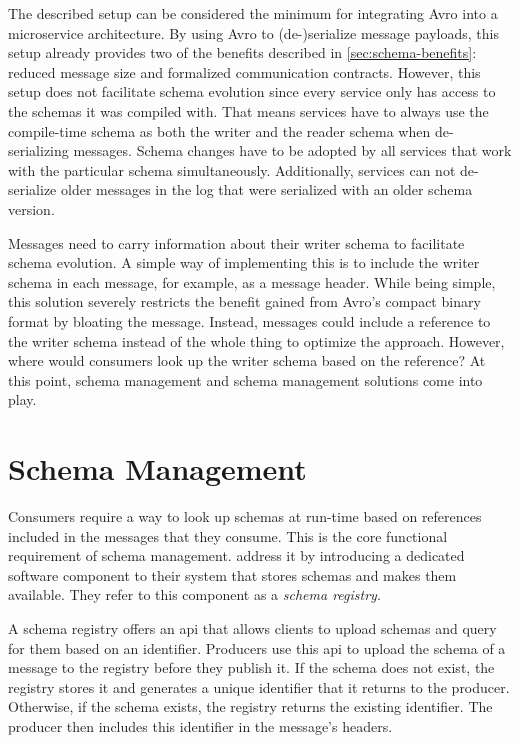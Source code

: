 The described setup can be considered the minimum for integrating Avro into a microservice architecture.
By using Avro to (de-)serialize message payloads, this setup already provides two of the benefits described in \ref{sec:schema-benefits}: reduced message size and formalized communication contracts.
However, this setup does not facilitate schema evolution since every service only has access to the schemas it was compiled with.
That means services have to always use the compile-time schema as both the writer and the reader schema when de-serializing messages.
Schema changes have to be adopted by all services that work with the particular schema simultaneously.
Additionally, services can not de-serialize older messages in the log that were serialized with an older schema version.

Messages need to carry information about their writer schema to facilitate schema evolution.
A simple way of implementing this is to include the writer schema in each message, for example, as a message header.
While being simple, this solution severely restricts the benefit gained from Avro's compact binary format by bloating the message.
Instead, messages could include a reference to the writer schema instead of the whole thing to optimize the approach.
However, where would consumers look up the writer schema based on the reference?
At this point, schema management and schema management solutions come into play.

\section{Schema Management}

Consumers require a way to look up schemas at run-time based on references included in the messages that they consume.
This is the core functional requirement of schema management.
\cite{kreps} address it by introducing a dedicated software component to their system that stores schemas and makes them available.
They refer to this component as a \emph{schema registry}.

A schema registry offers an \gls{api} that allows clients to upload schemas and query for them based on an identifier.
Producers use this \gls{api} to upload the schema of a message to the registry before they publish it.
If the schema does not exist, the registry stores it and generates a unique identifier that it returns to the producer.
Otherwise, if the schema exists, the registry returns the existing identifier.
The producer then includes this identifier in the message's headers.

